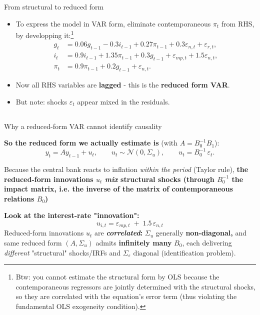 \documentclass{beamer}
\begin{document}
\begin{frame}{From structural to reduced form}

\begin{itemize}
  \item To express the model in VAR form, eliminate contemporaneous $\pi_t$ from RHS, by developping it:\footnote{\footnotesize Btw: you cannot estimate the structural form by OLS because the contemporaneous regressors are jointly determined with the structural shocks, so they are correlated with the equation’s error term (thus violating the fundamental OLS exogeneity condition). }
\[
\begin{aligned}
g_t &= 0.06 g_{t-1} - 0.3 i_{t-1} + 0.27 \pi_{t-1} + 0.3\varepsilon_{n,t} + \varepsilon_{r,t},\\
i_t &= 0.9 i_{t-1} + 1.35 \pi_{t-1} + 0.3 g_{t-1} + \varepsilon_{mp,t} + 1.5\varepsilon_{n,t},\\
\pi_t &= 0.9 \pi_{t-1} + 0.2 g_{t-1} + \varepsilon_{n,t}.
\end{aligned}
\]
  \item Now all RHS variables are \textbf{lagged} - this is the \textbf{reduced form VAR}.
  \item But note: shocks $\varepsilon_t$ appear mixed in the residuals.
\end{itemize}
\end{frame}


\subsection{}

\begin{frame}{Why a reduced-form VAR cannot identify causality}

\textbf{So the reduced form we actually estimate is} (with $A= B_0^{-1} B_1$):
\[
y_t = A y_{t-1} + u_t, \qquad u_t \sim \mathcal{N}(0,\Sigma_u),
\qquad u_t = B_0^{-1}\,\varepsilon_t.
\]

Because the central bank reacts to inflation \emph{within the period} (Taylor rule), \textbf{the reduced-form innovations $u_t$ \emph{mix} structural shocks (through $B_0^{-1}$ the impact matrix, i.e. the inverse of the matrix of contemporaneous relations $B_0$)}
\bigskip

\textbf{Look at the interest-rate "innovation":}
\[
\boxed{
u_{i,t} = \varepsilon_{mp,t} \;+\; 1.5\,\varepsilon_{n,t}
}
\]
Reduced-form innovations $u_t$ are\textbf{ \emph{correlated}:} $\Sigma_u$ generally \textbf{non-diagonal,} and same reduced form $(A,\Sigma_u)$ admits\textbf{ infinitely many} $B_0$, each delivering \emph{different} "structural" shocks/IRFs and $\Sigma_\varepsilon \text{ diagonal}$ (identification problem).  

\end{frame}
\end{document}
